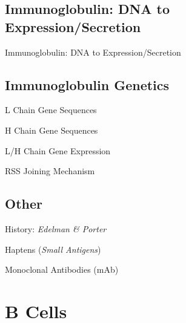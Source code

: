 \documentclass[10pt]{article}
\begin{document}
  \subsection{Immunoglobulin: DNA to Expression/Secretion}

    \begin{core}{Immunoglobulin: DNA to Expression/Secretion}

    \end{core}

  \subsection{Immunoglobulin Genetics}

    \begin{core}{L Chain Gene Sequences}

    \end{core} 

    \begin{core}{H Chain Gene Sequences}

    \end{core}

    \begin{core}{L/H Chain Gene Expression}

    \end{core}

    \begin{core}{RSS Joining Mechanism}

    \end{core}

  \subsection{Other}

  \begin{core}{History: \textit{Edelman \& Porter}}

    \end{core}

    \begin{core}{Haptens (\textit{Small Antigens})}

    \end{core}

    \begin{core}{Monoclonal Antibodies (mAb)}

    \end{core}

\section{B Cells}
\end{document}
